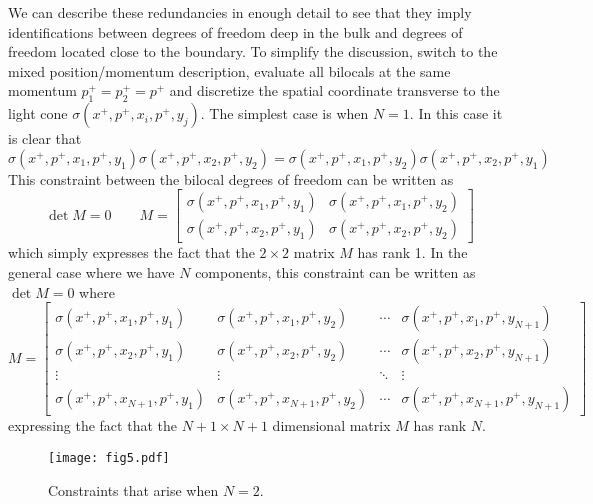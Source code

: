 \documentclass[a4paper,12pt]{article}
\begin{document}
We can describe these redundancies in enough detail to see that they imply identifications between degrees of freedom deep 
in the bulk and degrees of freedom located close to the boundary.
To simplify the discussion, switch to the mixed position/momentum description, evaluate all bilocals at the same momentum
$p_1^+=p_2^+=p^+$ and discretize the spatial coordinate transverse to the light cone $\sigma(x^+,p^+,x_i,p^+,y_j)$.
The simplest case is when $N=1$. 
In this case it is clear that
%
\begin{equation}
\sigma(x^+,p^+,x_1,p^+,y_1)\sigma(x^+,p^+,x_2,p^+,y_2)=
\sigma(x^+,p^+,x_1,p^+,y_2)\sigma(x^+,p^+,x_2,p^+,y_1) 
\end{equation}
%
This constraint between the bilocal degrees of freedom can be written as
%
\begin{equation}
\det M=0\qquad
M=\left[
\begin{matrix}
\sigma(x^+,p^+,x_1,p^+,y_1) &\sigma(x^+,p^+,x_1,p^+,y_2)\\
\sigma(x^+,p^+,x_2,p^+,y_1) &\sigma(x^+,p^+,x_2,p^+,y_2)
\end{matrix}\right]
\end{equation}
%
which simply expresses the fact that the $2\times 2$ matrix $M$ has rank 1.
In the general case where we have $N$ components, this constraint can be written as
$\det M=0$ where
% 
\begin{equation}
M=\left[
\begin{matrix}
\sigma(x^+,p^+,x_1,p^+,y_1) &\sigma(x^+,p^+,x_1,p^+,y_2) &\cdots &\sigma(x^+,p^+,x_1,p^+,y_{N+1})\\
\sigma(x^+,p^+,x_2,p^+,y_1) &\sigma(x^+,p^+,x_2,p^+,y_2) &\cdots &\sigma(x^+,p^+,x_2,p^+,y_{N+1})\\
\vdots                                          &\vdots                                           &\ddots &\vdots \\
\sigma(x^+,p^+,x_{N+1},p^+,y_1) &\sigma(x^+,p^+,x_{N+1},p^+,y_2) &\cdots
&\sigma(x^+,p^+,x_{N+1},p^+,y_{N+1})
\end{matrix}\right]
\end{equation}
%
expressing the fact that the $N+1\times N+1$ dimensional matrix $M$ has rank $N$.
%
\begin{figure}[h]%
\begin{center}
\texttt{[image: fig5.pdf]}%
\caption{Constraints that arise when $N=2$.}
\label{fig:Nis2}
\end{center}
\end{figure}
\end{document}
